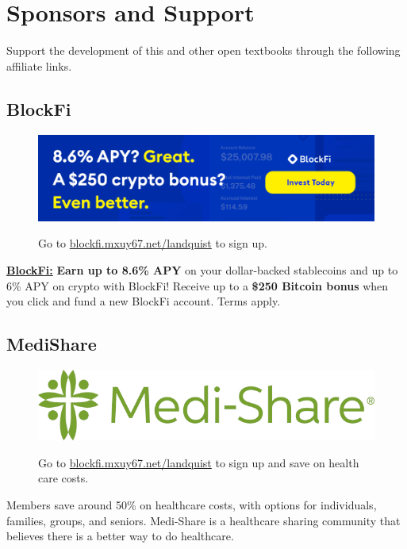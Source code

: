 \chapter*{Sponsors and Support}

Support the development of this and other open textbooks through the following affiliate links.

\section*{BlockFi}
\begin{figure}[!ht]
    \centering
    \href{https://blockfi.mxuy67.net/c/2612759/907789/10568}{\includegraphics[width=\textwidth]{img/support/blockFi/blockfi-banner0.png}}
    \caption{Go to \href{https://blockfi.mxuy67.net/c/2612759/907789/10568}{blockfi.mxuy67.net/landquist} to sign up.}
\end{figure}

\noindent \href{https://blockfi.mxuy67.net/c/2612759/907789/10568}{{\bf BlockFi:}} {\bf Earn up to 8.6\% APY} on your dollar-backed stablecoins and up to 6\% APY on crypto with BlockFi! Receive up to a {\bf \$250 Bitcoin bonus} when you click and fund a new BlockFi account. Terms apply.

\section*{MediShare}
\begin{figure}[!ht]
    \centering
    \href{https://bit.ly/3pP7ruB}{\includegraphics[width=\textwidth]{img/support/medishare/Medi-ShareLogo.jpg}}
    \caption{Go to \href{https://bit.ly/3pP7ruB}{blockfi.mxuy67.net/landquist} to sign up and save on health care costs.}
\end{figure}
\noindent Members save around 50\% on healthcare costs, with options for individuals, families, groups, and seniors. Medi-Share is a healthcare sharing community that believes there is a better way to do healthcare.

